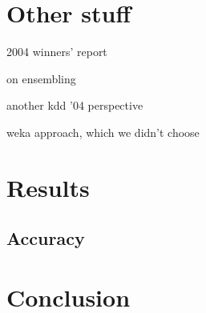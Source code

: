 \documentclass{article}
\begin{document}
\section{Other stuff}
2004 winners' report \cite{vogel2004anti}

on ensembling \cite{caruana2004ensemble}

another kdd '04 perspective \cite{caruana2004kdd}

weka approach, which we didn't choose \cite{pfahringer2004weka}


\section{Results}
\label{results}

\subsection{Accuracy}


\section{Conclusion}




\end{document}
